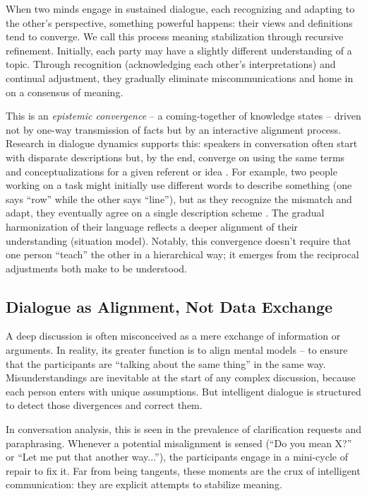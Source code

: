 \documentclass{article}
\begin{document}
When two minds engage in sustained dialogue, each recognizing and adapting to the other's perspective, something powerful happens: their views and definitions tend to converge. We call this process meaning stabilization through recursive refinement. Initially, each party may have a slightly different understanding of a topic. Through recognition (acknowledging each other's interpretations) and continual adjustment, they gradually eliminate miscommunications and home in on a consensus of meaning.

This is an \emph{epistemic convergence} -- a coming-together of knowledge states -- driven not by one-way transmission of facts but by an interactive alignment process. Research in dialogue dynamics supports this: speakers in conversation often start with disparate descriptions but, by the end, converge on using the same terms and conceptualizations for a given referent or idea \citep{pmc9791477}. For example, two people working on a task might initially use different words to describe something (one says ``row'' while the other says ``line''), but as they recognize the mismatch and adapt, they eventually agree on a single description scheme \citep{pmc9791477}. The gradual harmonization of their language reflects a deeper alignment of their understanding (situation model). Notably, this convergence doesn't require that one person ``teach'' the other in a hierarchical way; it emerges from the reciprocal adjustments both make to be understood.

\subsection{Dialogue as Alignment, Not Data Exchange}

A deep discussion is often misconceived as a mere exchange of information or arguments. In reality, its greater function is to align mental models -- to ensure that the participants are ``talking about the same thing'' in the same way. Misunderstandings are inevitable at the start of any complex discussion, because each person enters with unique assumptions. But intelligent dialogue is structured to detect those divergences and correct them.

In conversation analysis, this is seen in the prevalence of clarification requests and paraphrasing. Whenever a potential misalignment is sensed (``Do you mean X?'' or ``Let me put that another way...''), the participants engage in a mini-cycle of repair to fix it. Far from being tangents, these moments are the crux of intelligent communication: they are explicit attempts to stabilize meaning.
\end{document}
